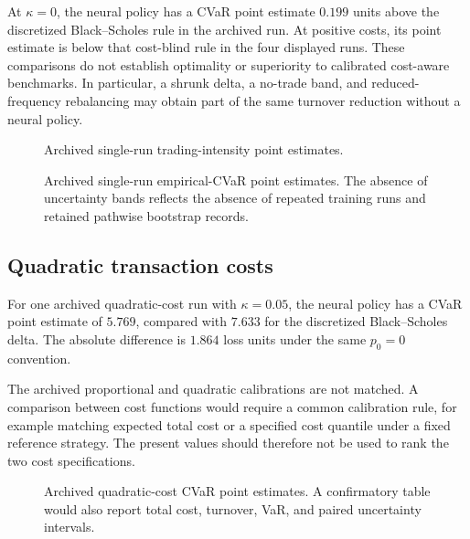At $\kappa=0$, the neural policy has a CVaR point estimate $0.199$ units above
the discretized Black--Scholes rule in the archived run. At positive costs, its
point estimate is below that cost-blind rule in the four displayed runs. These
comparisons do not establish optimality or superiority to calibrated
cost-aware benchmarks. In particular, a shrunk delta, a no-trade band, and
reduced-frequency rebalancing may obtain part of the same turnover reduction
without a neural policy.

\begin{figure}[htbp]
\centering
{}
\caption{Archived single-run trading-intensity point estimates.}
\label{fig:kappa_turnover}
\end{figure}

\begin{figure}[htbp]
\centering
{}
\caption{Archived single-run empirical-CVaR point estimates. The absence of
uncertainty bands reflects the absence of repeated training runs and retained
pathwise bootstrap records.}
\label{fig:kappa}
\end{figure}

\subsection{Quadratic transaction costs}

For one archived quadratic-cost run with $\kappa=0.05$, the neural policy has a
CVaR point estimate of $5.769$, compared with $7.633$ for the discretized
Black--Scholes delta. The absolute difference is $1.864$ loss units under the
same $p_0=0$ convention.

The archived proportional and quadratic calibrations are not matched. A
comparison between cost functions would require a common calibration rule, for
example matching expected total cost or a specified cost quantile under a fixed
reference strategy. The present values should therefore not be used to rank the
two cost specifications.

\begin{figure}[htbp]
\centering
{}
\caption{Archived quadratic-cost CVaR point estimates. A confirmatory table
would also report total cost, turnover, VaR, and paired uncertainty intervals.}
\label{fig:quadratic}
\end{figure}

